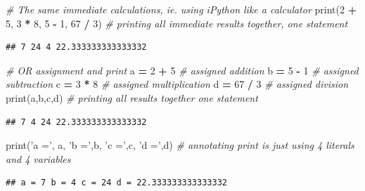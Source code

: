 \documentclass[]{book}
\newenvironment{Shaded}{\begin{snugshade}}{\end{snugshade}}
\newcommand{\DecValTok}[1]{\textcolor[rgb]{0.00,0.00,0.81}{#1}}
\newcommand{\StringTok}[1]{\textcolor[rgb]{0.31,0.60,0.02}{#1}}
\newcommand{\CommentTok}[1]{\textcolor[rgb]{0.56,0.35,0.01}{\textit{#1}}}
\newcommand{\OperatorTok}[1]{\textcolor[rgb]{0.81,0.36,0.00}{\textbf{#1}}}
\newcommand{\BuiltInTok}[1]{#1}
\newcommand{\NormalTok}[1]{#1}
\theoremstyle{definition}
\theoremstyle{definition}
\theoremstyle{definition}
\theoremstyle{remark}
\begin{document}
\begin{Shaded}
\begin{Highlighting}[]
\CommentTok{# The same immediate calculations, ie. using iPython like a calculator}
\BuiltInTok{print}\NormalTok{(}\DecValTok{2} \OperatorTok{+} \DecValTok{5}\NormalTok{, }\DecValTok{3} \OperatorTok{*} \DecValTok{8}\NormalTok{, }\DecValTok{5} \OperatorTok{-} \DecValTok{1}\NormalTok{, }\DecValTok{67} \OperatorTok{/} \DecValTok{3}\NormalTok{) }\CommentTok{# printing all immediate results together, one statement}
\end{Highlighting}
\end{Shaded}

\begin{verbatim}
## 7 24 4 22.333333333333332
\end{verbatim}

\begin{Shaded}
\begin{Highlighting}[]
\CommentTok{# OR assignment and print}
\NormalTok{a }\OperatorTok{=} \DecValTok{2} \OperatorTok{+} \DecValTok{5}           \CommentTok{# assigned addition}
\NormalTok{b }\OperatorTok{=} \DecValTok{5} \OperatorTok{-} \DecValTok{1}           \CommentTok{# assigned subtraction}
\NormalTok{c }\OperatorTok{=} \DecValTok{3} \OperatorTok{*} \DecValTok{8}           \CommentTok{# assigned multiplication}
\NormalTok{d }\OperatorTok{=} \DecValTok{67} \OperatorTok{/} \DecValTok{3}          \CommentTok{# assigned division}
\BuiltInTok{print}\NormalTok{(a,b,c,d)      }\CommentTok{# printing all results together one statement}
\end{Highlighting}
\end{Shaded}

\begin{verbatim}
## 7 4 24 22.333333333333332
\end{verbatim}

\begin{Shaded}
\begin{Highlighting}[]
\BuiltInTok{print}\NormalTok{(}\StringTok{'a ='}\NormalTok{, a, }\StringTok{'b ='}\NormalTok{,b, }\StringTok{'c ='}\NormalTok{,c, }\StringTok{'d ='}\NormalTok{,d) }\CommentTok{# annotating print is just using 4 literals and 4 variables}
\end{Highlighting}
\end{Shaded}

\begin{verbatim}
## a = 7 b = 4 c = 24 d = 22.333333333333332
\end{verbatim}
\end{document}
